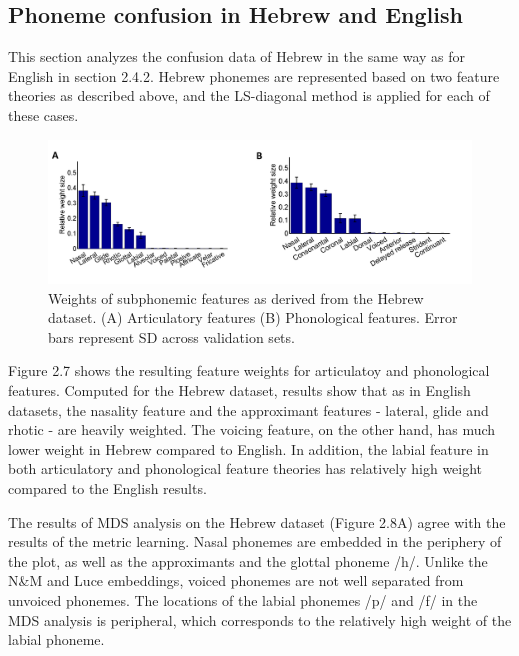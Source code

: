 \subsection{Phoneme confusion in Hebrew and English}
This section analyzes the confusion data of Hebrew in the same way as for English in section 2.4.2. Hebrew phonemes are represented based on two feature theories as described above, and the LS-diagonal method is applied for each of these cases.

\begin{figure}[h]
\vspace{.3in}
\includegraphics[width=\linewidth]{Figures/Ch2/weight_Heb.PNG}
\caption{Weights of subphonemic features as derived from the Hebrew dataset. (A) Articulatory features (B) Phonological features. Error bars represent SD across validation sets.}
\end{figure}

Figure 2.7 shows the resulting feature weights for articulatoy and phonological features. Computed for the Hebrew dataset, results show that as in English datasets, the nasality feature and the approximant features - lateral, glide and rhotic - are heavily weighted. The voicing feature, on the other hand, has much lower weight in Hebrew compared to English. In addition, the labial feature in both articulatory and phonological feature theories has relatively high weight compared to the English results.

The results of MDS analysis on the Hebrew dataset (Figure 2.8A) agree with the results of the metric learning. Nasal phonemes are embedded in the periphery of the plot, as well as the approximants and the glottal phoneme /h/. Unlike the N\&M and Luce embeddings, voiced phonemes are not well separated from unvoiced phonemes. The locations of the labial phonemes /p/ and /f/ in the MDS analysis is peripheral, which corresponds to the relatively high weight of the labial phoneme. 

